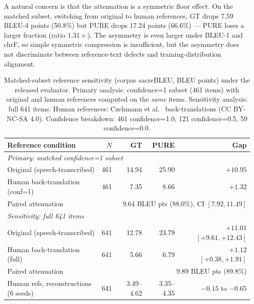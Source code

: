 \documentclass[pdflatex,sn-chicago]{sn-jnl}
\begin{document}
A natural concern is that the attenuation is a symmetric floor effect. On the matched subset, switching from original to human references, GT drops $7.59$ BLEU-4 points (50.8\%) but PURE drops $17.24$ points (66.6\%) --- PURE loses a larger fraction (ratio $1.31\times$). The asymmetry is even larger under BLEU-1 and chrF, so simple symmetric compression is insufficient, but the asymmetry does not discriminate between reference-text defects and training-distribution alignment.

\begin{table}[h]
\centering
\scriptsize
\caption{Matched-subset reference sensitivity (corpus sacreBLEU, BLEU points) under the released evaluator. Primary analysis: confidence=1 subset (461 items) with original and human references computed on the \emph{same} items. Sensitivity analysis: full 641 items. Human references: Czehmann et al.~\cite{czehmann2026sacred} back-translations (CC BY-NC-SA 4.0). Confidence breakdown: 461 confidence=1.0, 121 confidence=0.5, 59 confidence=0.0.}
\label{tab:ref_sensitivity}
\begin{tabular}{lrrrr}
\toprule
Reference condition & $N$ & GT & PURE & Gap \\
\midrule
\multicolumn{5}{l}{\emph{Primary: matched confidence=1 subset}} \\
Original (speech-transcribed) & 461 & 14.94 & 25.90 & $+10.95$ \\
Human back-translation (conf=1) & 461 & 7.35 & 8.66 & $+1.32$ \\
Paired attenuation & \multicolumn{4}{r}{$9.64$ BLEU pts (88.0\%), CI $[7.92, 11.49]$} \\
\midrule
\multicolumn{5}{l}{\emph{Sensitivity: full 641 items}} \\
Original (speech-transcribed) & 641 & 12.78 & 23.79 & $+11.01$ $[+9.61,+12.43]$ \\
Human back-translation (full) & 641 & 5.66 & 6.79 & $+1.12$ $[+0.38,+1.91]$ \\
Paired attenuation & \multicolumn{4}{r}{$9.89$ BLEU pts (89.8\%)} \\
\midrule
Human refs, reconstructions (6 seeds) & 641 & 3.49--4.62 & 3.35--4.35 & $-0.15$ to $-0.65$ \\
\bottomrule
\end{tabular}
\end{table}
\end{document}
